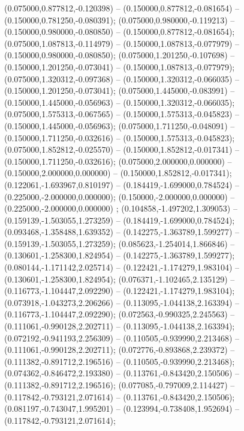  (0.075000,0.877812,-0.120398) -- (0.150000,0.877812,-0.081654) -- (0.150000,0.781250,-0.080391);
 (0.075000,0.980000,-0.119213) -- (0.150000,0.980000,-0.080850) -- (0.150000,0.877812,-0.081654);
 (0.075000,1.087813,-0.114979) -- (0.150000,1.087813,-0.077979) -- (0.150000,0.980000,-0.080850);
 (0.075000,1.201250,-0.107698) -- (0.150000,1.201250,-0.073041) -- (0.150000,1.087813,-0.077979);
 (0.075000,1.320312,-0.097368) -- (0.150000,1.320312,-0.066035) -- (0.150000,1.201250,-0.073041);
 (0.075000,1.445000,-0.083991) -- (0.150000,1.445000,-0.056963) -- (0.150000,1.320312,-0.066035);
 (0.075000,1.575313,-0.067565) -- (0.150000,1.575313,-0.045823) -- (0.150000,1.445000,-0.056963);
 (0.075000,1.711250,-0.048091) -- (0.150000,1.711250,-0.032616) -- (0.150000,1.575313,-0.045823);
 (0.075000,1.852812,-0.025570) -- (0.150000,1.852812,-0.017341) -- (0.150000,1.711250,-0.032616);
 (0.075000,2.000000,0.000000) -- (0.150000,2.000000,0.000000) -- (0.150000,1.852812,-0.017341);
 (0.122061,-1.693967,0.810197) -- (0.184419,-1.699000,0.784524) -- (0.225000,-2.000000,0.000000);
 (0.150000,-2.000000,0.000000) -- (0.225000,-2.000000,0.000000) ;
 (0.104858,-1.497202,1.309053) -- (0.159139,-1.503055,1.273259) -- (0.184419,-1.699000,0.784524);
 (0.093468,-1.358488,1.639352) -- (0.142275,-1.363789,1.599277) -- (0.159139,-1.503055,1.273259);
 (0.085623,-1.254014,1.866846) -- (0.130601,-1.258300,1.824954) -- (0.142275,-1.363789,1.599277);
 (0.080144,-1.171142,2.025714) -- (0.122421,-1.174279,1.983104) -- (0.130601,-1.258300,1.824954);
 (0.076371,-1.102465,2.135129) -- (0.116773,-1.104447,2.092290) -- (0.122421,-1.174279,1.983104);
 (0.073918,-1.043273,2.206266) -- (0.113095,-1.044138,2.163394) -- (0.116773,-1.104447,2.092290);
 (0.072563,-0.990325,2.245563) -- (0.111061,-0.990128,2.202711) -- (0.113095,-1.044138,2.163394);
 (0.072192,-0.941193,2.256309) -- (0.110505,-0.939990,2.213468) -- (0.111061,-0.990128,2.202711);
 (0.072776,-0.893868,2.239372) -- (0.111382,-0.891712,2.196516) -- (0.110505,-0.939990,2.213468);
 (0.074362,-0.846472,2.193380) -- (0.113761,-0.843420,2.150506) -- (0.111382,-0.891712,2.196516);
 (0.077085,-0.797009,2.114427) -- (0.117842,-0.793121,2.071614) -- (0.113761,-0.843420,2.150506);
 (0.081197,-0.743047,1.995201) -- (0.123994,-0.738408,1.952694) -- (0.117842,-0.793121,2.071614);
